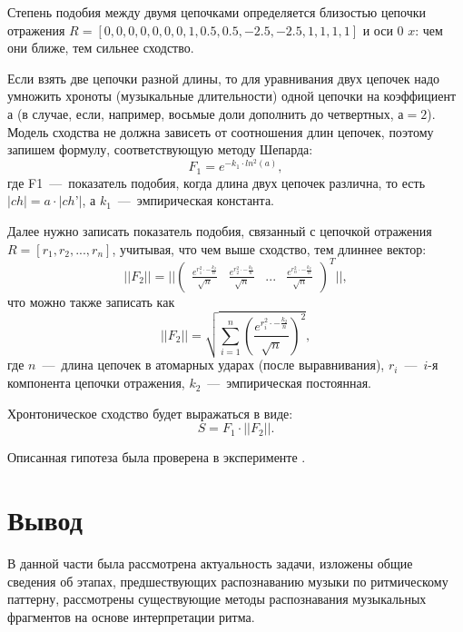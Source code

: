 Степень подобия между двумя цепочками определяется близостью цепочки отражения $R = [0, 0, 0, 0, 0, 0, 0, 1, 0.5, 0.5, -2.5, -2.5, 1, 1, 1, 1]$ и оси 0 $x$: чем они ближе, тем сильнее сходство.

Если взять две цепочки разной длины, то для уравнивания двух цепочек надо умножить хроноты (музыкальные длительности) одной цепочки на коэффициент $а$ (в случае, если, например, восьмые доли дополнить до четвертных, $а = 2$). Модель сходства не должна зависеть от соотношения длин цепочек, поэтому запишем формулу, соответствующую методу Шепарда:
\begin{equation}
	F_1 = e^{-k_1 \cdot ln^2(a)},
\end{equation}
где F1~---~показатель подобия, когда длина двух цепочек различна, то есть $\lvert ch \rvert = a \cdot \lvert ch’ \rvert$, а $k_1$~---~эмпирическая константа.

Далее нужно записать показатель подобия, связанный с цепочкой отражения $R = [r_1, r_2, ..., r_n]$, учитывая, что чем выше сходство, тем длиннее вектор:
\begin{equation}
	\lvert \lvert F_2 \rvert \rvert = \lvert \lvert \begin{pmatrix}
		\frac{e^{r_1^2 \cdot -\frac{k_2}{n}}}{\sqrt{n}} & \frac{e^{r_2^2 \cdot -\frac{k_2}{n}}}{\sqrt{n}} & ... & \frac{e^{r_n^2 \cdot -\frac{k_2}{n}}}{\sqrt{n}}
	\end{pmatrix}^T \rvert \rvert,
\end{equation}
что можно также записать как
\begin{equation}
	\lvert \lvert F_2 \rvert \rvert = \sqrt{
		\sum_{i = 1}^{n} (\frac{e^{r_i^2 \cdot -\frac{k_2}{n}}}{\sqrt{n}})^2},
\end{equation}
где $n$~---~длина цепочек в атомарных ударах (после выравнивания), $r_i$~---~$i$-я компонента цепочки отражения, $k_2$~---~эмпирическая постоянная.

Хронтоническое сходство будет выражаться в виде:
\begin{equation}
	S = F_1 \cdot \lvert \lvert F_2 \rvert \rvert.
\end{equation}

Описанная гипотеза была проверена в эксперименте \cite{bib13}.

\section{Вывод}

В данной части была рассмотрена актуальность задачи, изложены общие сведения об этапах, предшествующих распознаванию музыки по ритмическому паттерну, рассмотрены существующие методы распознавания музыкальных фрагментов на основе интерпретации ритма.

